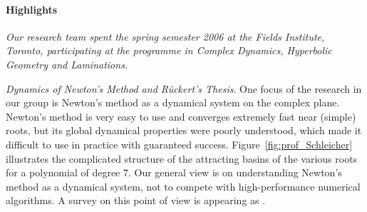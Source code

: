 \paragraph{Highlights}

{\em Our research team spent the spring semester 2006 at the Fields
Institute, Toronto, participating at the programme in Complex
Dynamics, Hyperbolic Geometry and Laminations.}


{\sl Dynamics of Newton's Method and R\"uckert's Thesis}.
One focus of the research in our group is Newton's method as a dynamical system on the complex plane. Newton's method is very easy to use and converges extremely fast near (simple) roots, but its global dynamical properties were poorly understood, which made it difficult to use in practice with guaranteed success. Figure~\ref{fig:prof_Schleicher} illustrates the complicated structure of the attracting basins of the various roots for a polynomial of degree $7$. Our general view is on understanding Newton's method as a dynamical system, not to compete with high-performance numerical algorithms. A survey on this point of view is appearing as \cite{JohannesNewtonSurvey}.

